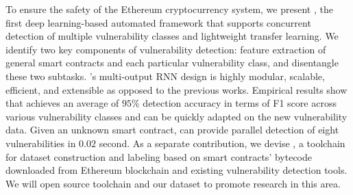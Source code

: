 To ensure the safety of the Ethereum cryptocurrency system,  
we present \sys{}, the first deep learning-based automated framework that supports concurrent detection of multiple vulnerability classes and lightweight transfer learning. 
We identify two key components of vulnerability detection: feature extraction of general smart contracts and each particular vulnerability class, and disentangle these two subtasks.
\sys{}'s multi-output RNN design is highly modular, scalable, efficient, and extensible as opposed to the previous works.
Empirical results show that \sys{} achieves an average of $95\%$ detection accuracy in terms of F1 score across various vulnerability classes and can be quickly adapted on the new vulnerability data. Given an unknown smart contract, \sys{} can provide parallel detection of eight vulnerabilities in $0.02$ second.
As a separate contribution, we devise \datatool{}, a toolchain for dataset construction and labeling based on smart contracts' bytecode downloaded from Ethereum blockchain and existing vulnerability detection tools.
We will open source
\datatool{} toolchain and our dataset to promote research in this area.
\clearpage

